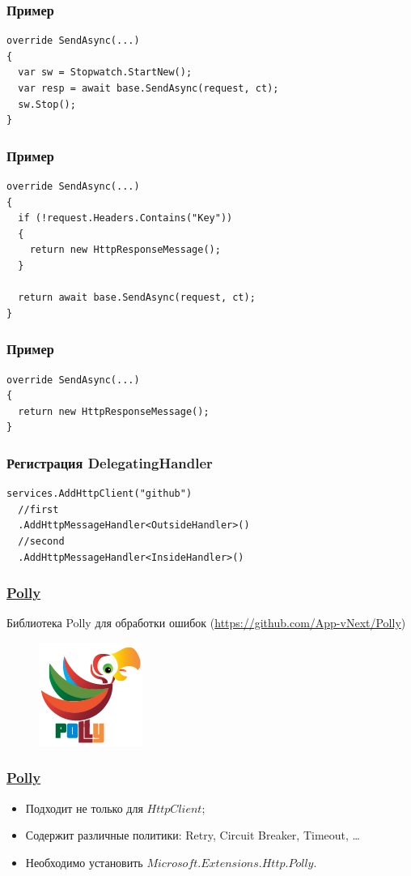 \documentclass[17pt,aspectratio=169]{beamer}
\begin{document}
\begin{frame}[fragile]
\frametitle{Пример}
\begin{lstlisting}
override SendAsync(...)
{
  var sw = Stopwatch.StartNew();
  var resp = await base.SendAsync(request, ct);
  sw.Stop();
}     
\end{lstlisting}
\end{frame}

\begin{frame}[fragile]
\frametitle{Пример}
\begin{lstlisting}
override SendAsync(...)
{
  if (!request.Headers.Contains("Key"))
  {
    return new HttpResponseMessage();
  }
  
  return await base.SendAsync(request, ct);
}     
\end{lstlisting}
\end{frame}

\begin{frame}[fragile]
\frametitle{Пример}
\begin{lstlisting}
override SendAsync(...)
{
  return new HttpResponseMessage();
}     
\end{lstlisting}
\end{frame}

\begin{frame}[fragile]
\frametitle{Регистрация DelegatingHandler}
\begin{lstlisting}
services.AddHttpClient("github")
  //first
  .AddHttpMessageHandler<OutsideHandler>()
  //second
  .AddHttpMessageHandler<InsideHandler>()
\end{lstlisting}
\end{frame}

\begin{frame}
\frametitle{\href{https://github.com/App-vNext/Polly}{Polly}}
Библиотека Polly для обработки ошибок (\href{https://github.com/App-vNext/Polly}{https://github.com/App-vNext/Polly})
\begin{figure}
\includegraphics[scale=0.4]{polly}
\end{figure}
\end{frame}

\begin{frame}
\frametitle{\href{https://github.com/App-vNext/Polly}{Polly}}
\begin{itemize}
	\item <1-> Подходит не только для $HttpClient$;
	\item <2-> Содержит различные политики: Retry, Circuit Breaker, Timeout, \ldots
	\item <3-> Необходимо установить \href{https://www.nuget.org/packages/Microsoft.Extensions.Http.Polly/}{$Microsoft.Extensions.Http.Polly$}.
\end{itemize}
\end{frame}
\end{document}
